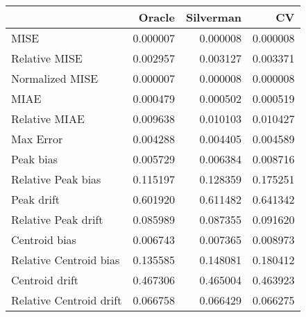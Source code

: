 \begin{tabular}{lrrr}
  \hline
 & Oracle & Silverman & CV \\ 
  \hline
MISE & 0.000007 & 0.000008 & 0.000008 \\ 
  Relative MISE & 0.002957 & 0.003127 & 0.003371 \\ 
  Normalized MISE & 0.000007 & 0.000008 & 0.000008 \\ 
  MIAE & 0.000479 & 0.000502 & 0.000519 \\ 
  Relative MIAE & 0.009638 & 0.010103 & 0.010427 \\ 
  Max Error & 0.004288 & 0.004405 & 0.004589 \\ 
  Peak bias & 0.005729 & 0.006384 & 0.008716 \\ 
  Relative Peak bias & 0.115197 & 0.128359 & 0.175251 \\ 
  Peak drift & 0.601920 & 0.611482 & 0.641342 \\ 
  Relative Peak drift & 0.085989 & 0.087355 & 0.091620 \\ 
  Centroid bias & 0.006743 & 0.007365 & 0.008973 \\ 
  Relative Centroid bias & 0.135585 & 0.148081 & 0.180412 \\ 
  Centroid drift & 0.467306 & 0.465004 & 0.463923 \\ 
  Relative Centroid drift & 0.066758 & 0.066429 & 0.066275 \\ 
   \hline
\end{tabular}
